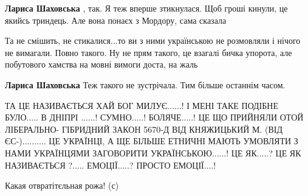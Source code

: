 \begin{itemize}
\begin{itemize}
\textbf{Лариса Шаховська} , так. Я теж вперше зтикнулася. Щоб гроші кинули, це
якийсь триндець. Але вона понаєх з Мордору, сама сказала

 

Та не смішить, не стикалися...то ви з ними українською не розмовляли і нічого
не вимагали. Повно такого. Ну не прям такого, це взагалі бичка упорота, але
побутового хамства на мовні вимоги доста, на жаль


 
\textbf{Лариса Шаховська} Теж такого не зустрічала. Тим більше останнім часом.
\end{itemize}

 

\obeycr
ТА ЦЕ НАЗИВАЄТЬСЯ ХАЙ БОГ МИЛУЄ......!
І МЕНІ ТАКЕ ПОДІБНЕ БУЛО.....
В ДНІПРІ ......!
СУМНО.....!
БОЛЯЧЕ.....!
ЦЕ ЩО ПРИЙНЯЛИ
ОТОЙ ЛІБЕРАЛЬНО-
ГІБРИДНИЙ ЗАКОН
5670-Д ВІД КНЯЖИЦЬКИЙ М.
(ВІД ЄС-)..........
ЦЕ УКРАЇНЦІ, А ЩЕ
БІЛЬШЕ ЕТНИЧНІ МАЮТЬ УМОВЛЯТИ
З НАМИ УКРАЇНЦЯМИ ЗАГОВОРИТИ УКРАЇНСЬКОЮ......!
ЦЕ ЯК.....?
ЦЕ ЯК НАЗИВАЄТЬСЯ ?.....
ЕМОЦІЇ.....?
ПРОСТО ЕМОЦІЇ....!
\restorecr

 
Какая отвратітєльная рожа! (с)

 

\end{itemize}
